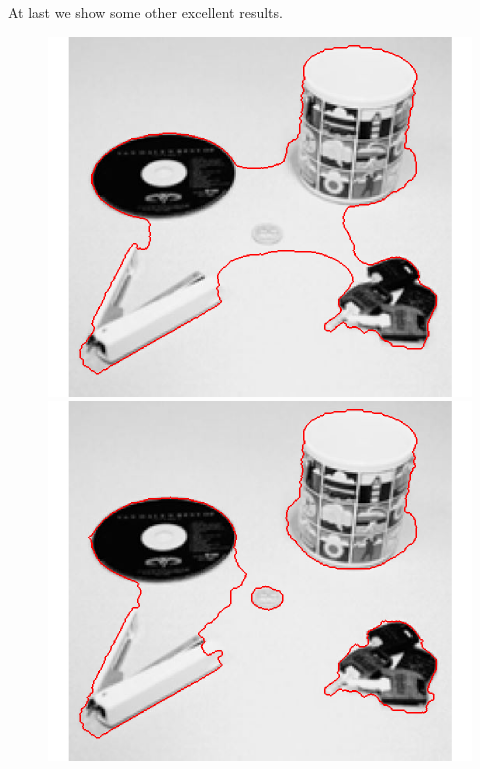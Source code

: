 \documentclass{article}
\begin{document}
At last we show some other excellent results. 

\begin{figure}[H]
\begin{center}
\includegraphics[scale=.47]{ac_1.png}
\includegraphics[scale=.47]{ac_4.png}

\end{center}
\end{figure}
\end{document}
